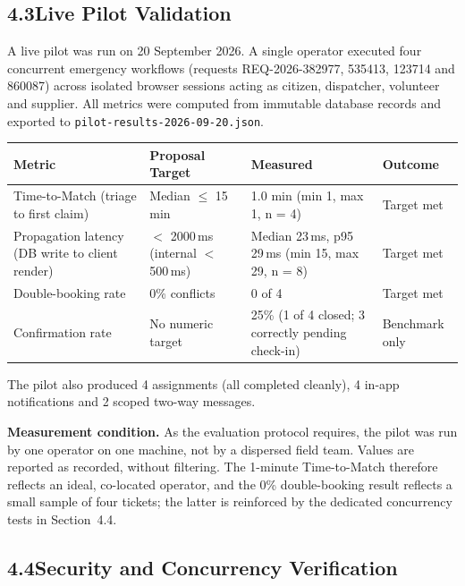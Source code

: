 \documentclass[11pt,a4paper]{article}
\newcommand{\tc}[1]{\texttt{\small #1}}
\begin{document}
\subsection{4.3\quad Live Pilot Validation}\label{s43}

A live pilot was run on 20 September 2026. A single operator executed four concurrent emergency workflows (requests REQ-2026-382977, 535413, 123714 and 860087) across isolated browser sessions acting as citizen, dispatcher, volunteer and supplier. All metrics were computed from immutable database records and exported to \tc{pilot-results-2026-09-20.json}.

\renewcommand{\arraystretch}{1.3}
\begin{tabularx}{\textwidth}{@{}p{1.2in}p{1.25in}p{1.5in}X@{}}
\toprule
\textbf{Metric} & \textbf{Proposal Target} & \textbf{Measured} & \textbf{Outcome}\\
\midrule
Time-to-Match (triage to first claim) & Median $\leq$ 15 min & 1.0 min (min 1, max 1, n = 4) & Target met\\
Propagation latency (DB write to client render) & $<$ 2000\,ms (internal $<$ 500\,ms) & Median 23\,ms, p95 29\,ms (min 15, max 29, n = 8) & Target met\\
Double-booking rate & 0\% conflicts & 0 of 4 & Target met\\
Confirmation rate & No numeric target & 25\% (1 of 4 closed; 3 correctly pending check-in) & Benchmark only\\
\bottomrule
\end{tabularx}
\renewcommand{\arraystretch}{1}

The pilot also produced 4 assignments (all completed cleanly), 4 in-app notifications and 2 scoped two-way messages.

\textbf{Measurement condition.} As the evaluation protocol requires, the pilot was run by one operator on one machine, not by a dispersed field team. Values are reported as recorded, without filtering. The 1-minute Time-to-Match therefore reflects an ideal, co-located operator, and the 0\% double-booking result reflects a small sample of four tickets; the latter is reinforced by the dedicated concurrency tests in Section~4.4.

\subsection{4.4\quad Security and Concurrency Verification}\label{s44}
\end{document}
